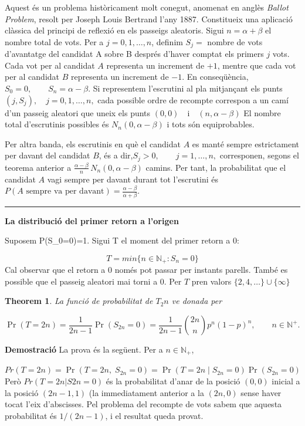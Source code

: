 \documentclass[
  catalan,
]{article}
\newtheorem{theorem}{Theorem}[section]
\theoremstyle{definition}
\theoremstyle{definition}
\theoremstyle{definition}
\theoremstyle{definition}
\theoremstyle{remark}
\begin{document}
Aquest és un problema històricament molt conegut, anomenat en anglès \emph{Ballot Problem}, resolt per Joseph Louis Bertrand l'any 1887. Constitueix una aplicació clàssica del principi de reflexió en els passeigs aleatoris.
Sigui \(n=\alpha+\beta\) el nombre total de vots. Per a \(j=0,1,\ldots,n\), definim \(S_j=\) nombre de vots d'avantatge del candidat A sobre B després d'haver comptat els primers \(j\) vots. Cada vot per al candidat \(A\) representa un increment de \(+1\), mentre que cada vot per al candidat \(B\) representa un increment de \(-1\). En conseqüència, \(S_0=0,\qquad S_n=\alpha-\beta\).
Si representem l'escrutini al pla mitjançant els punts \((j,S_j),\quad j=0,1,\ldots,n,\) cada possible ordre de recompte correspon a un camí d'un passeig aleatori que uneix els punts \((0,0) \quad \text{i} \quad(n,\alpha-\beta)\) El nombre total d'escrutinis possibles és \(N_n(0,\alpha-\beta)\) i tots són equiprobables.

Per altra banda, els escrutinis en què el candidat \(A\) es manté sempre estrictament per davant del candidat \(B\), és a dir,\(S_j>0,\qquad j=1,\ldots,n,\) corresponen, segons el teorema anterior a \(\frac{\alpha-\beta}{n}\, N_n(0,\alpha-\beta)\) camins. Per tant, la probabilitat que el candidat \(A\) vagi sempre per davant durant tot l'escrutini és \(P(A\text{ sempre va per davant}) = \frac{\alpha-\beta}{\alpha+\beta}\).

\begin{center}\rule{0.5\linewidth}{0.5pt}\end{center}

\textbf{La distribució del primer retorn a l'origen}

Suposem P(S\_0=0)=1. Sigui T el moment del primer retorn a 0:

\[
T=min \{n \in \mathbb{N}_+ : S_n=0 \}
\]
Cal observar que el retorn a 0 només pot passar per instants parells. També es possible que el passeig aleatori mai torni a 0. Per \(T\) pren valors \(\{2,4,\dots\} \cup \{ \infty \}\)

\begin{theorem}
La funció de probabilitat de \(T_2n\) ve donada per

\[
\Pr(T=2n)=\frac{1}{2n-1}\Pr(S_{2n}=0)
=\frac{1}{2n-1}\binom{2n}{n}p^n(1-p)^n,
\qquad n\in\mathbb{N}^{+}. \label{eq:restorn1} 
\]
\end{theorem}

\textbf{Demostració}
La prova és la següent. Per a \(n \in \mathbb{N}_{+}\),

\(Pr(T=2n)=\Pr(T=2n,\;S_{2n}=0)=\Pr(T=2n\mid S_{2n}=0)\Pr(S_{2n}=0)\)
Però \(Pr(T = 2n|S2n = 0)\) és la probabilitat d'anar de la posició \((0, 0)\) inicial a la posició \((2n − 1, 1)\) (la immediatament anterior a la \((2n, 0)\) sense haver tocat l'eix d'abscisses. Pel problema del recompte de vots sabem que aquesta
probabilitat és \(1/(2n − 1)\), i el resultat queda provat.
\end{document}
